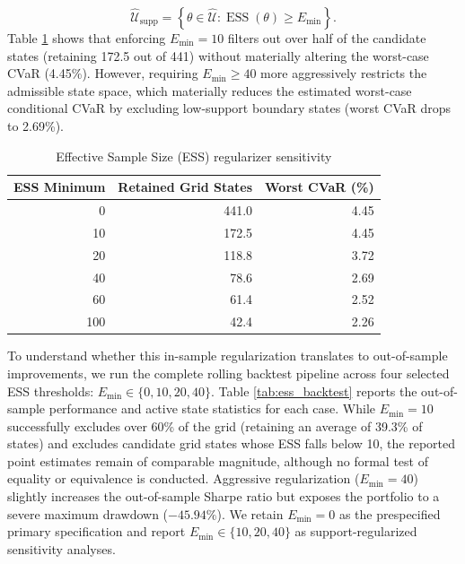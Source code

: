 \documentclass[smallextended]{svjour3}
\begin{document}
\[
\widehat{\mathcal{U}}_{\text{supp}} = \left\{
\theta\in\widehat{\mathcal U}:
\operatorname{ESS}(\theta)\ge E_{\min}
\right\}.
\] Table \ref{tab:sens_ess} shows that enforcing $E_{\min} = 10$ filters out over half of the candidate states (retaining 172.5 out of 441) without materially altering the worst-case CVaR (4.45\%). However, requiring $E_{\min} \ge 40$ more aggressively restricts the admissible state space, which materially reduces the estimated worst-case conditional CVaR by excluding low-support boundary states (worst CVaR drops to 2.69\%).

\begin{table}[htbp]
\centering
\caption{Effective Sample Size (ESS) regularizer sensitivity}
\label{tab:sens_ess}
\begin{tabular}{rrr}
\toprule
\textbf{ESS Minimum} & \textbf{Retained Grid States} & \textbf{Worst CVaR (\%)} \\
\midrule
0 & 441.0 & 4.45 \\
10 & 172.5 & 4.45 \\
20 & 118.8 & 3.72 \\
40 & 78.6 & 2.69 \\
60 & 61.4 & 2.52 \\
100 & 42.4 & 2.26 \\
\bottomrule
\end{tabular}
\end{table}

To understand whether this in-sample regularization translates to out-of-sample improvements, we run the complete rolling backtest pipeline across four selected ESS thresholds: $E_{\min} \in \{0, 10, 20, 40\}$. Table \ref{tab:ess_backtest} reports the out-of-sample performance and active state statistics for each case. While $E_{\min}=10$ successfully excludes over 60\% of the grid (retaining an average of 39.3\% of states) and excludes candidate grid states whose ESS falls below 10, the reported point estimates remain of comparable magnitude, although no
formal test of equality or equivalence is conducted. Aggressive regularization ($E_{\min}=40$) slightly increases the out-of-sample Sharpe ratio but exposes the portfolio to a severe maximum drawdown ($-45.94\%$). We retain $E_{\min}=0$ as the prespecified primary specification and report $E_{\min}\in\{10,20,40\}$ as support-regularized sensitivity analyses.
\end{document}
